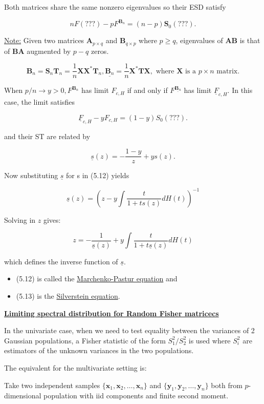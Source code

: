 \documentclass[twoside]{article}
\begin{document}
Both matrices share the same nonzero eigenvalues so their ESD satisfy

$$nF(???)-pF^{\mathbf{B}_n}=(n-p)\mathbf{S}_0(???).$$

\underline{Note:} Given two matrices $\mathbf{A}_{p\times q}$ and $\mathbf{B}_{q\times p}$ where $p\geq q$, eigenvalues of $\mathbf{AB}$ is that of $\mathbf{BA}$ augmented by $p-q$ zeros.

$$\mathbf{B}_n=\mathbf{S}_n\mathbf{T}_n=\frac{1}{n}\mathbf{XX}^*\mathbf{T}_n, \underline{\mathbf{B}_n}=\frac{1}{n}\mathbf{X^*TX},\text{ where $\mathbf{X}$ is a $p\times n$ matrix.}$$

When $p/n\to y>0, F^{\mathbf{B}_n}$ has limit $F_{c,H}$ if and only if $F^{\underline{\mathbf{B}_n}}$ has limit $\underline{F}_{c,H}$. In this case, the limit satisfies

$$\underline{F}_{c,H}-yF_{c,H}=(1-y)S_0(???).$$

and their ST are related by

$$\underline{s}(z)=-\frac{1-y}z+ys(z).$$

Now substituting $\underline{s}$ for s in (5.12) yields

$$\underline{s}(z)=\left(z-y\int\frac{t}{1+ts(z)}dH(t)\right)^{-1}$$

Solving in $z$ gives:

\begin{equation}z=-\frac{1}{\underline{s}(z)}+y\int\frac{t}{1+t\underline{s}(z)}dH(t)\end{equation}

which defines the inverse function of $\underline{s}$.

\begin{itemize}
	\item (5.12) is called the \underline{Marchenko-Pastur equation} and\\
	\item (5.13) is the \underline{Silverstein equation}.
\end{itemize}

\underline{\textbf{Limiting spectral distribution for Random Fisher matricecs}}

In the univariate case, when we need to test equality between the variances of 2 Gaussian populations, a Fisher statistic of the form $S_1^2/S_2^2$ is used where $S_i^2$ are estimators of the unknown variances in the two populations.

The equivalent for the multivariate setting is:

Take two independent samples $\{\mathbf{x}_1,\mathbf{x}_2,\dots,\mathbf{x}_n\}$ and $\{\mathbf{y}_1,\mathbf{y}_2,\dots,\mathbf{y}_n\}$ both from $p$-dimensional population with iid components and finite second moment.
\end{document}
